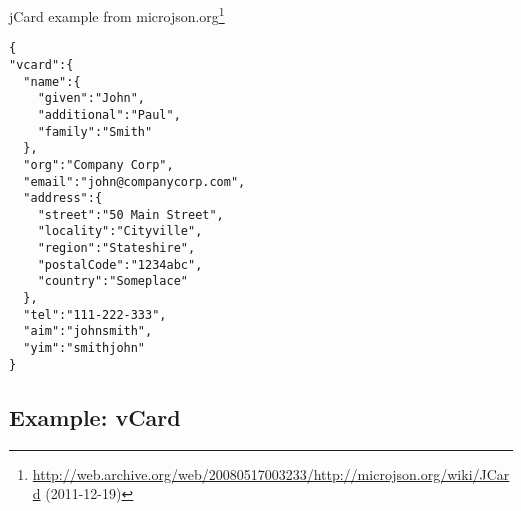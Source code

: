 \documentclass[12pt,a4paper]{scrartcl}		%
\newcommand{\citeurl}[2]{\url{#1} (#2)}
\begin{document}
jCard example from microjson.org\footnote{\citeurl{http://web.archive.org/web/20080517003233/http://microjson.org/wiki/JCard}{2011-12-19}}
\begin{verbatim}
{
"vcard":{
  "name":{
    "given":"John",
    "additional":"Paul",
    "family":"Smith"
  },
  "org":"Company Corp",
  "email":"john@companycorp.com",
  "address":{
    "street":"50 Main Street",
    "locality":"Cityville",
    "region":"Stateshire",
    "postalCode":"1234abc",
    "country":"Someplace"
  },
  "tel":"111-222-333",
  "aim":"johnsmith",
  "yim":"smithjohn"
}
\end{verbatim}

\subsection{Example: vCard}
\end{document}
